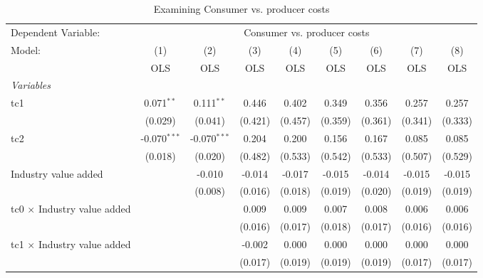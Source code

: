 
\begin{table}[htbp]
   \caption{Examining Consumer vs. producer costs}
   \centering
   \begin{tabular}{lcccccccc}
      \toprule
      Dependent Variable: & \multicolumn{8}{c}{Consumer vs. producer costs}\\
      Model:                                  & (1)            & (2)            & (3)     & (4)     & (5)     & (6)     & (7)     & (8)\\  
                                              &  OLS           & OLS            & OLS     & OLS     & OLS     & OLS     & OLS     & OLS\\  
      \midrule
      \emph{Variables}\\
      tc1                                     & 0.071$^{**}$   & 0.111$^{**}$   & 0.446   & 0.402   & 0.349   & 0.356   & 0.257   & 0.257\\   
                                              & (0.029)        & (0.041)        & (0.421) & (0.457) & (0.359) & (0.361) & (0.341) & (0.333)\\   
      tc2                                     & -0.070$^{***}$ & -0.070$^{***}$ & 0.204   & 0.200   & 0.156   & 0.167   & 0.085   & 0.085\\   
                                              & (0.018)        & (0.020)        & (0.482) & (0.533) & (0.542) & (0.533) & (0.507) & (0.529)\\   
      Industry value added                    &                & -0.010         & -0.014  & -0.017  & -0.015  & -0.014  & -0.015  & -0.015\\   
                                              &                & (0.008)        & (0.016) & (0.018) & (0.019) & (0.020) & (0.019) & (0.019)\\   
      tc0 $\times$ Industry value added       &                &                & 0.009   & 0.009   & 0.007   & 0.008   & 0.006   & 0.006\\   
                                              &                &                & (0.016) & (0.017) & (0.018) & (0.017) & (0.016) & (0.016)\\   
      tc1 $\times$ Industry value added       &                &                & -0.002  & 0.000   & 0.000   & 0.000   & 0.000   & 0.000\\   
                                              &                &                & (0.017) & (0.019) & (0.019) & (0.019) & (0.017) & (0.017)\\   

\end{tabular}
\end{table}
